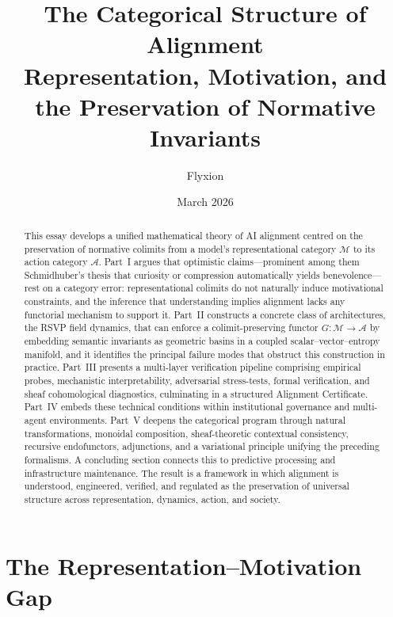 \documentclass[12pt]{article}
\title{\bfseries The Categorical Structure of Alignment\\[0.4em]
\large\mdseries Representation, Motivation, and the Preservation of Normative Invariants}
\author{Flyxion}
\date{March 2026}
\theoremstyle{definition}
\begin{document}
\maketitle

\begin{abstract}
This essay develops a unified mathematical theory of AI alignment centred on
the preservation of normative colimits from a model's representational category
$\mathcal{M}$ to its action category $\mathcal{A}$. Part~I argues that
optimistic claims---prominent among them Schmidhuber's thesis that curiosity or
compression automatically yields benevolence---rest on a category error:
representational colimits do not naturally induce motivational constraints, and
the inference that understanding implies alignment lacks any functorial mechanism
to support it. Part~II constructs a concrete class of architectures, the RSVP
field dynamics, that can enforce a colimit-preserving functor $G:\mathcal{M}\to
\mathcal{A}$ by embedding semantic invariants as geometric basins in a coupled
scalar--vector--entropy manifold, and it identifies the principal failure modes
that obstruct this construction in practice. Part~III presents a multi-layer
verification pipeline comprising empirical probes, mechanistic interpretability,
adversarial stress-tests, formal verification, and sheaf cohomological
diagnostics, culminating in a structured Alignment Certificate. Part~IV embeds
these technical conditions within institutional governance and multi-agent
environments. Part~V deepens the categorical program through natural
transformations, monoidal composition, sheaf-theoretic contextual consistency,
recursive endofunctors, adjunctions, and a variational principle unifying the
preceding formalisms. A concluding section connects this to predictive
processing and infrastructure maintenance. The result is a framework in which
alignment is understood, engineered, verified, and regulated as the preservation
of universal structure across representation, dynamics, action, and society.
\end{abstract}


\newpage
\tableofcontents
\newpage


\part{The Representation--Motivation Gap}
\end{document}
